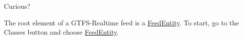 Curious?

The root element of a G\+T\+F\+S-\/\+Realtime feed is a \hyperlink{structFeedEntity}{Feed\+Entity}. To start, go to the Classes button and choose \hyperlink{structFeedEntity}{Feed\+Entity}. 